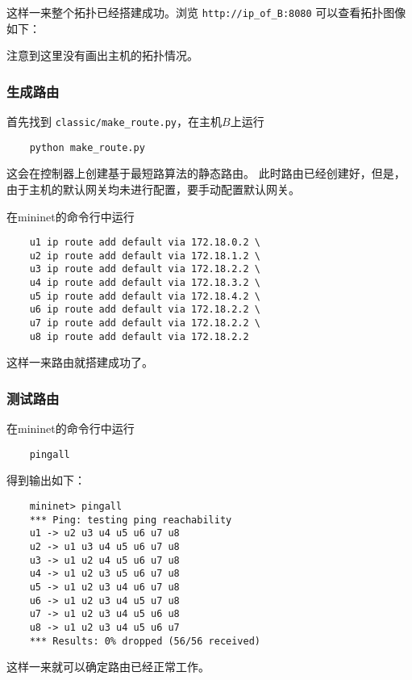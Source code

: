 这样一来整个拓扑已经搭建成功。浏览 \texttt{http://ip\_of\_B:8080} 可以查看拓扑图像如下：



注意到这里没有画出主机的拓扑情况。

\subsubsection{生成路由}

首先找到 \texttt{classic/make\_route.py}，在主机$B$上运行

\begin{lstlisting}
	python make_route.py
\end{lstlisting}

这会在控制器上创建基于最短路算法的静态路由。
此时路由已经创建好，但是，由于主机的默认网关均未进行配置，要手动配置默认网关。

在mininet的命令行中运行

\begin{lstlisting}
	u1 ip route add default via 172.18.0.2 \
	u2 ip route add default via 172.18.1.2 \
	u3 ip route add default via 172.18.2.2 \
	u4 ip route add default via 172.18.3.2 \
	u5 ip route add default via 172.18.4.2 \
	u6 ip route add default via 172.18.2.2 \
	u7 ip route add default via 172.18.2.2 \
	u8 ip route add default via 172.18.2.2
\end{lstlisting}

这样一来路由就搭建成功了。

\subsubsection{测试路由}

在mininet的命令行中运行

\begin{lstlisting}
	pingall
\end{lstlisting}

得到输出如下：

\begin{lstlisting}
	mininet> pingall
	*** Ping: testing ping reachability
	u1 -> u2 u3 u4 u5 u6 u7 u8 
	u2 -> u1 u3 u4 u5 u6 u7 u8 
	u3 -> u1 u2 u4 u5 u6 u7 u8 
	u4 -> u1 u2 u3 u5 u6 u7 u8 
	u5 -> u1 u2 u3 u4 u6 u7 u8 
	u6 -> u1 u2 u3 u4 u5 u7 u8 
	u7 -> u1 u2 u3 u4 u5 u6 u8 
	u8 -> u1 u2 u3 u4 u5 u6 u7 
	*** Results: 0% dropped (56/56 received)
\end{lstlisting}

这样一来就可以确定路由已经正常工作。

